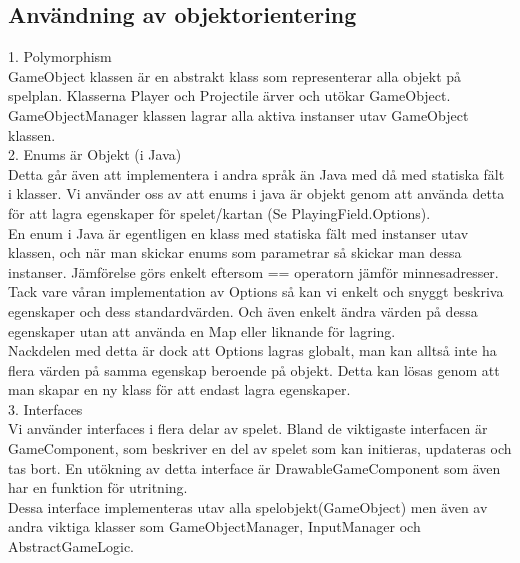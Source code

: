 \subsection{Användning av objektorientering}
1. Polymorphism\\
GameObject klassen är en abstrakt klass som representerar alla objekt på spelplan. Klasserna Player och Projectile ärver och utökar GameObject.\\
GameObjectManager klassen lagrar alla aktiva instanser utav GameObject klassen.\\
\vspace{11pt}
2. Enums är Objekt (i Java)\\
Detta går även att implementera i andra språk än Java med då med statiska fält i klasser.
Vi använder oss av att enums i java är objekt genom att använda detta för att lagra egenskaper för spelet/kartan (Se PlayingField.Options).\\
En enum i Java är egentligen en klass med statiska fält med instanser utav klassen, och när man skickar enums som parametrar så skickar man dessa instanser. Jämförelse görs enkelt eftersom == operatorn jämför minnesadresser.\\
Tack vare våran implementation av Options så kan vi enkelt och snyggt beskriva egenskaper och dess standardvärden. Och även enkelt ändra värden på dessa egenskaper utan att använda en Map eller liknande för lagring.\\
Nackdelen med detta är dock att Options lagras globalt, man kan alltså inte ha flera värden på samma egenskap beroende på objekt. Detta kan lösas genom att man skapar en ny klass för att endast lagra egenskaper.\\
\vspace{11pt}
3. Interfaces\\
Vi använder interfaces i flera delar av spelet. Bland de viktigaste interfacen är GameComponent, som beskriver en del av spelet som kan initieras, updateras och tas bort. En utökning av detta interface är DrawableGameComponent som även har en funktion för utritning.\\
Dessa interface implementeras utav alla spelobjekt(GameObject) men även av andra viktiga klasser som GameObjectManager, InputManager och AbstractGameLogic.\\
